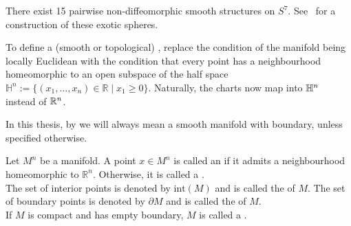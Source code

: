 \documentclass[a4paper,12pt]{article}
\begin{document}

\begin{example}
    There exist 15 pairwise non-diffeomorphic smooth structures on \(S^7\). See\ \cite{kervaire} for a construction of these exotic spheres.
\end{example}

\begin{definition}
    To define a (smooth or topological) , replace the condition of the manifold being locally Euclidean with the condition that every point has a neighbourhood homeomorphic to an open subspace of the half space \(\mathbb{H}^n:=\{(x_1,\dots,x_n)\in\mathbb{R}\mid x_1\geq0\}\). Naturally, the charts now map into \(\mathbb{H}^n\) instead of \(\mathbb{R}^n\).
\end{definition}

\begin{comment}
\begin{definition}[Manifold]
    A \demph{smooth manifold with boundary} \(M=(M,[\mathcal{A}])\) is the data of a topological space \(M\) and an equivalence class \([\mathcal{A}]\) of smooth atlases such that:
    \begin{itemize}
        \item \(M\) is Hausdorff,
        \item \(M\) is second countable,
        \item \(\mathcal{A}\) is locally finite.
    \end{itemize}
\end{definition}
\end{comment}

\begin{remark}
    In this thesis, by  we will always mean a smooth manifold with boundary, unless specified otherwise.
\end{remark}

\begin{definition}
    Let \(M^n\) be a manifold. A point \(x\in M^n\) is called an  if it admits a neighbourhood homeomorphic to \(\mathbb{R}^n\). Otherwise, it is called a .\\
    The set of interior points is denoted by \(\mathrm{int}(M)\) and is called the  of \(M\). The set of boundary points is denoted by \(\partial M\) and is called the  of \(M\).\\
    If \(M\) is compact and has empty boundary, \(M\) is called a . %
\end{definition}
\end{document}
